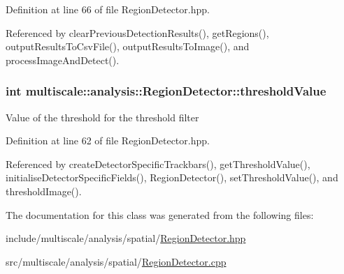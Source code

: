 Definition at line 66 of file Region\-Detector.\-hpp.



Referenced by clear\-Previous\-Detection\-Results(), get\-Regions(), output\-Results\-To\-Csv\-File(), output\-Results\-To\-Image(), and process\-Image\-And\-Detect().

\hypertarget{classmultiscale_1_1analysis_1_1RegionDetector_a0f7469d124c0b906d199e00ea5713007}{
\subsubsection[{threshold\-Value}]{\setlength{\rightskip}{0pt plus 5cm}int multiscale\-::analysis\-::\-Region\-Detector\-::threshold\-Value\hspace{0.3cm}{\ttfamily [private]}}}\label{classmultiscale_1_1analysis_1_1RegionDetector_a0f7469d124c0b906d199e00ea5713007}
Value of the threshold for the threshold filter 

Definition at line 62 of file Region\-Detector.\-hpp.



Referenced by create\-Detector\-Specific\-Trackbars(), get\-Threshold\-Value(), initialise\-Detector\-Specific\-Fields(), Region\-Detector(), set\-Threshold\-Value(), and threshold\-Image().



The documentation for this class was generated from the following files\-:\begin{DoxyCompactItemize}
\item 
include/multiscale/analysis/spatial/\hyperlink{RegionDetector_8hpp}{Region\-Detector.\-hpp}\item 
src/multiscale/analysis/spatial/\hyperlink{RegionDetector_8cpp}{Region\-Detector.\-cpp}\end{DoxyCompactItemize}
